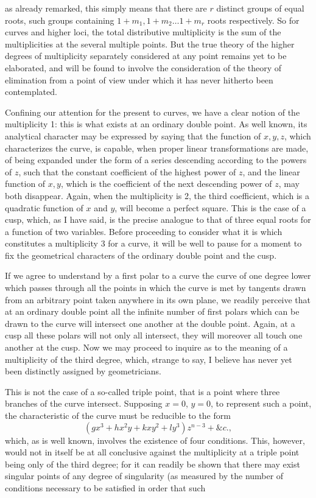 \documentclass[11pt]{article}
\newcommand{\sourcepage}[1]{\marginpar{\scriptsize p.~#1}}
\begin{document}
{{\sourcepage{371}
as already remarked, this simply means that there are $r$ distinct groups of equal roots, such groups containing $1+m_1,1+m_2\ldots1+m_r$ roots respectively. So for curves and higher loci, the total distributive multiplicity is the sum of the multiplicities at the several multiple points. But the true theory of the higher degrees of multiplicity separately considered at any point remains yet to be elaborated, and will be found to involve the consideration of the theory of elimination from a point of view under which it has never hitherto been contemplated.

Confining our attention for the present to curves, we have a clear notion of the multiplicity 1: this is what exists at an ordinary double point. As well known, its analytical character may be expressed by saying that the function of $x,y,z$, which characterizes the curve, is capable, when proper linear transformations are made, of being expanded under the form of a series descending according to the powers of $z$, such that the constant coefficient of the highest power of $z$, and the linear function of $x,y$, which is the coefficient of the next descending power of $z$, may both disappear. Again, when the multiplicity is 2, the third coefficient, which is a quadratic function of $x$ and $y$, will become a perfect square. This is the case of a cusp, which, as I have said, is the precise analogue to that of three equal roots for a function of two variables. Before proceeding to consider what it is which constitutes a multiplicity 3 for a curve, it will be well to pause for a moment to fix the geometrical characters of the ordinary double point and the cusp.

If we agree to understand by a first polar to a curve the curve of one degree lower which passes through all the points in which the curve is met by tangents drawn from an arbitrary point taken anywhere in its own plane, we readily perceive that at an ordinary double point all the infinite number of first polars which can be drawn to the curve will intersect one another at the double point. Again, at a cusp all these polars will not only all intersect, they will moreover all touch one another at the cusp. Now we may proceed to inquire as to the meaning of a multiplicity of the third degree, which, strange to say, I believe has never yet been distinctly assigned by geometricians.

This is not the case of a so-called triple point, that is a point where three branches of the curve intersect. Supposing $x=0$, $y=0$, to represent such a point, the characteristic of the curve must be reducible to the form
\[
(gx^3+hx^2y+kxy^2+ly^3)z^{n-3}+\&c.,
\]
which, as is well known, involves the existence of four conditions. This, however, would not in itself be at all conclusive against the multiplicity at a triple point being only of the third degree; for it can readily be shown that there may exist singular points of any degree of singularity (as measured by the number of conditions necessary to be satisfied in order that such

}}
\end{document}
